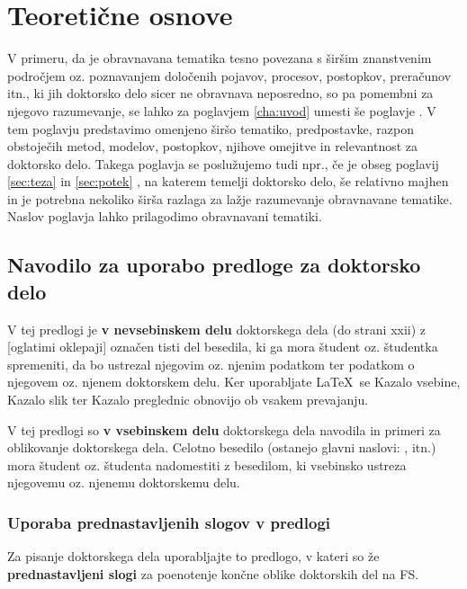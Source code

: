 \chapter{Teoretične osnove}\label{cha:teoreticne_osnove}


V primeru, da je obravnavana tematika tesno povezana s širšim znanstvenim področjem oz. poznavanjem določenih pojavov, procesov, postopkov, preračunov itn., ki jih doktorsko delo sicer ne obravnava neposredno, so pa pomembni za njegovo razumevanje, se lahko za poglavjem \ref{cha:uvod}  umesti še poglavje . V tem poglavju predstavimo omenjeno širšo tematiko, predpostavke, razpon obstoječih metod, modelov, postopkov, njihove omejitve in relevantnost za doktorsko delo. Takega poglavja se poslužujemo tudi npr., če je obseg poglavij \ref{sec:teza}  in \ref{sec:potek} , na katerem temelji doktorsko delo, še relativno majhen in je potrebna nekoliko širša razlaga za lažje razumevanje obravnavane tematike. Naslov poglavja lahko prilagodimo obravnavani tematiki.
\section{Navodilo za uporabo predloge za doktorsko delo}\label{sec:uporaba_predloge}
V tej predlogi je \textbf{v nevsebinskem delu} doktorskega dela (do strani xxii) z [oglatimi oklepaji] označen tisti del besedila, ki ga mora študent oz. študentka spremeniti, da bo ustrezal njegovim oz. njenim podatkom ter podatkom o njegovem oz. njenem doktorskem delu. Ker uporabljate \LaTeX~se Kazalo vsebine, Kazalo slik ter Kazalo preglednic obnovijo ob vsakem prevajanju.

V tej predlogi so \textbf{v vsebinskem delu} doktorskega dela navodila in primeri za oblikovanje doktorskega dela. Celotno besedilo (ostanejo glavni naslovi: ,  itn.) mora študent oz. študenta nadomestiti z besedilom, ki vsebinsko ustreza njegovemu oz. njenemu doktorskemu delu.

\subsection{Uporaba prednastavljenih slogov v predlogi}\label{sec:prednastavitve}
Za pisanje doktorskega dela uporabljajte to predlogo, v kateri so že \textbf{prednastavljeni slogi} za poenotenje končne oblike doktorskih del na FS.

